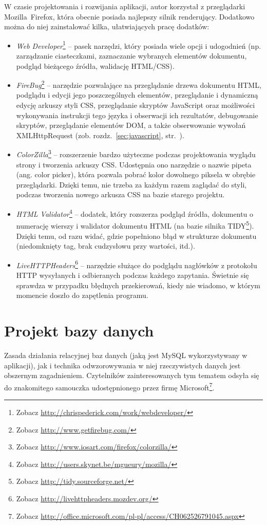 \documentclass[a4paper,12pt,oneside]{report}
\begin{document}
W czasie projektowania i rozwijania aplikacji, autor korzystał z przeglądarki Mozilla~Firefox, która obecnie posiada najlepszy silnik renderujący. Dodatkowo można do niej zainstalować kilka, ułatwiających pracę dodatków:
\begin{itemize}
  \item \emph{Web Developer}\footnote{Zobacz \url{http://chrispederick.com/work/webdeveloper/}} -- pasek narzędzi, który posiada wiele opcji i udogodnień (np. zarządzanie ciasteczkami, zaznaczanie wybranych elementów dokumentu, podgląd bieżącego źródła, walidację HTML/CSS).
  \item \emph{FireBug}\footnote{Zobacz \url{http://www.getfirebug.com/}} -- narzędzie pozwalające na przeglądanie drzewa dokumentu HTML, podglądu i edycji jego poszczególnych elementów, przeglądanie i dynamiczną edycję arkuszy styli CSS, przeglądanie skryptów JavaScript oraz możliwości wykonywania instrukcji tego języka i obserwacji ich rezultatów, debugowanie skryptów, przeglądanie elementów DOM, a także obserwowanie wywołań XMLHttpRequest (zob. rozdz.~\ref{sec:javascript}, str.~\pageref{sec:javascript}).
  \item \emph{ColorZilla}\footnote{Zobacz \url{http://www.iosart.com/firefox/colorzilla/}} -- rozszerzenie bardzo użyteczne podczas projektowania wyglądu strony i tworzenia arkuszy CSS. Udostępnia ono narzędzie o nazwie pipeta (ang. color picker), która pozwala pobrać kolor dowolnego piksela w obrębie przeglądarki. Dzięki temu, nie trzeba za każdym razem zaglądać do styli, podczas tworzenia nowego arkusza CSS na bazie starego projektu.
  \item \emph{HTML Validator}\footnote{Zobacz \url{http://users.skynet.be/mgueury/mozilla/}} -- dodatek, który rozszerza podgląd źródła, dokumentu o numerację wierszy i walidator dokumentu HTML (na bazie silnika TIDY\footnote{Zobacz \url{http://tidy.sourceforge.net/}}). Dzięki temu, od razu widać, gdzie popełniono błąd w strukturze dokumentu (niedomknięty tag, brak cudzysłowu przy wartości, itd.).
  \item \emph{LiveHTTPHeaders}\footnote{Zobacz \url{http://livehttpheaders.mozdev.org/}} -- narzędzie służące do podglądu nagłówków z protokołu HTTP wysyłanych i odbieranych podczas każdego zapytania. Świetnie się sprawdza w przypadku błędnych przekierowań, kiedy nie wiadomo, w którym momencie doszło do zapętlenia programu.
\end{itemize}

\section{Projekt bazy danych}
\label{sec:db-projekt}
Zasada działania relacyjnej baz danych (jaką jest MySQL wykorzystywany w aplikacji), jak i technika odwzorowywania w niej rzeczywistych danych jest obszernym zagadnieniem. Czytelników zainteresowanych tym tematem odsyła się do znakomitego samouczka udostępnionego przez firmę Microsoft\footnote{Zobacz \url{http://office.microsoft.com/pl-pl/access/CH062526791045.aspx}}.
\end{document}
